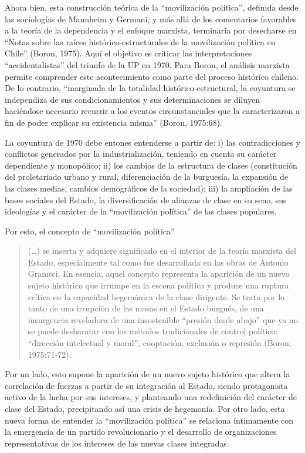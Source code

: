 Ahora bien, esta construcción teórica de la ``movilización política'', definida desde las sociologías de Mannheim y Germani, y más allá de los comentarios favorables a la teoría de la dependencia y el enfoque marxista, terminaría por desecharse en ``Notas sobre las raíces histórico-estructurales de la movilización política en Chile'' (Boron, 1975). Aquí el objetivo es criticar las interpretaciones ``accidentalistas'' del triunfo de la UP en 1970. Para Boron, el análisis marxista permite comprender este acontecimiento como parte del proceso histórico chileno. De lo contrario, ``marginada de la totalidad histórico-estructural, la coyuntura se independiza de sus condicionamientos y sus determinaciones se diluyen haciéndose necesario recurrir a los eventos circunstanciales que la caracterizaron a fin de poder explicar su existencia misma'' (Boron, 1975:68).

La coyuntura de 1970 debe entones entenderse a partir de: i) las contradicciones y conflictos generados por la industrialización, teniendo en cuenta su carácter dependiente y monopólico; ii) los cambios de la estructura de clases (constitución del proletariado urbano y rural, diferenciación de la burguesía, la expansión de las clases medias, cambios demográficos de la sociedad); iii) la ampliación de las bases sociales del Estado, la diversificación de alianzas de clase en su seno, sus ideologías y el carácter de la ``movilización política'' de las clases populares.

Por esto, el concepto de ``movilización política''

\begin{quote}
(\dots) se inserta y adquiere significado en el interior de la teoría marxista del Estado, especialmente tal como fue desarrollada en las obras de Antonio Gramsci. En esencia, aquel concepto representa la aparición de un nuevo sujeto histórico que irrumpe en la escena política y produce una ruptura crítica en la capacidad hegemónica de la clase dirigente. Se trata por lo tanto de una irrupción de las masas en el Estado burgués, de una insurgencia reveladora de una insostenible ``presión desde abajo'' que ya no se puede desbaratar con los métodos tradicionales de control político: ``dirección intelectual y moral'', cooptación, exclusión o represión (Boron, 1975:71-72).
\end{quote}

Por un lado, esto supone la aparición de un nuevo sujeto histórico que altera la correlación de fuerzas a partir de su integración al Estado, siendo protagonista activo de la lucha por sus intereses, y planteando una redefinición del carácter de clase del Estado, precipitando así una crisis de hegemonía. Por otro lado, esta nueva forma de entender la ``movilización política'' se relaciona íntimamente con la emergencia de un partido revolucionario y el desarrollo de organizaciones representativas de los intereses de las nuevas clases integradas.

